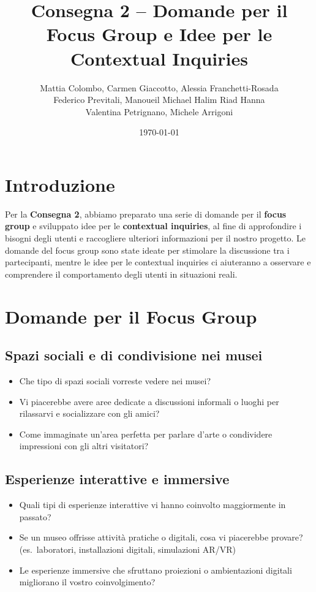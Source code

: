 \documentclass{article}
\title{Consegna 2 – Domande per il Focus Group e Idee per le Contextual Inquiries}
\author{Mattia Colombo, Carmen Giaccotto, Alessia Franchetti-Rosada \\Federico Previtali, Manoueil Michael Halim Riad Hanna \\ Valentina Petrignano, Michele Arrigoni}
\date{\today}
\begin{document}
\maketitle

\section*{Introduzione}

Per la \textbf{Consegna 2}, abbiamo preparato una serie di domande per il \textbf{focus group} e sviluppato idee per le \textbf{contextual inquiries}, al fine di approfondire i bisogni degli utenti e raccogliere ulteriori informazioni per il nostro progetto. Le domande del focus group sono state ideate per stimolare la discussione tra i partecipanti, mentre le idee per le contextual inquiries ci aiuteranno a osservare e comprendere il comportamento degli utenti in situazioni reali.

\section{Domande per il Focus Group}

\subsection{Spazi sociali e di condivisione nei musei}

\begin{itemize}
    \item Che tipo di spazi sociali vorreste vedere nei musei?
    \item Vi piacerebbe avere aree dedicate a discussioni informali o luoghi per rilassarvi e socializzare con gli amici?
    \item Come immaginate un’area perfetta per parlare d’arte o condividere impressioni con gli altri visitatori?
\end{itemize}

\subsection{Esperienze interattive e immersive}

\begin{itemize}
    \item Quali tipi di esperienze interattive vi hanno coinvolto maggiormente in passato?
    \item Se un museo offrisse attività pratiche o digitali, cosa vi piacerebbe provare? (es.\ laboratori, installazioni digitali, simulazioni AR/VR)
    \item Le esperienze immersive che sfruttano proiezioni o ambientazioni digitali migliorano il vostro coinvolgimento?
\end{itemize}
\end{document}
